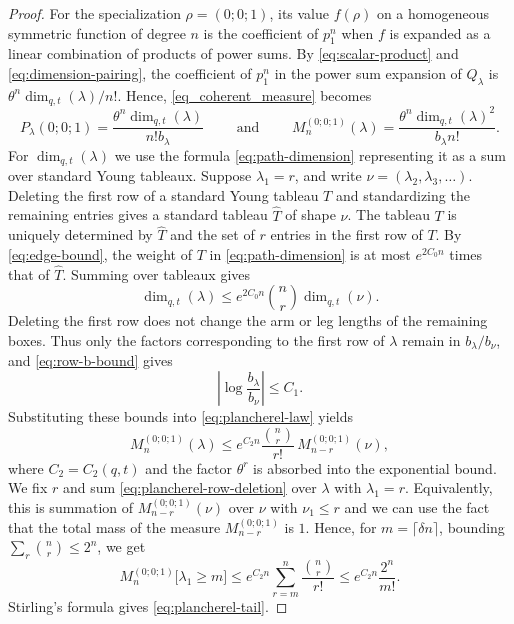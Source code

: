 \documentclass[11pt,reqno]{amsart}
\theoremstyle{definition}
\theoremstyle{remark}
\numberwithin{equation}{section}
\newcommand{\ddim}{\operatorname{dim}_{q,t}}
\begin{document}
\begin{proof}
For the specialization $\rho=(0;0;1)$, its value $f(\rho)$ on a homogeneous symmetric function of degree $n$ is the coefficient of $p_1^n$ when $f$ is expanded as a linear combination of products of power sums. By \eqref{eq:scalar-product} and \eqref{eq:dimension-pairing}, the
coefficient of $p_1^n$ in the power sum expansion of $Q_\lambda$ is
$\theta^n\ddim(\lambda)/n!$. Hence, \eqref{eq_coherent_measure} becomes
\begin{equation}\label{eq:plancherel-law}
P_\lambda(0;0;1)=\frac{\theta^n\ddim(\lambda)}{n!b_\lambda}\qquad
\text{ and } \qquad
 M_n^{(0;0;1)}(\lambda)=
 \frac{\theta^n\ddim(\lambda)^2}{b_\lambda n!}.
\end{equation}
For $\ddim(\lambda)$ we use the formula \eqref{eq:path-dimension} representing it as a sum over standard Young tableaux.
Suppose $\lambda_1=r$, and write $\nu=(\lambda_2,\lambda_3,\ldots)$.
Deleting the first row of a standard Young tableau $T$ and standardizing the
remaining entries gives a standard tableau $\widehat T$ of shape $\nu$.
The tableau $T$ is uniquely determined by $\widehat T$ and the set of $r$
entries in the first row of $T$. By \eqref{eq:edge-bound}, the weight of $T$ in \eqref{eq:path-dimension} is
at most $e^{2C_0n}$ times that of $\widehat T$. Summing over tableaux gives
\[
 \ddim(\lambda)\le e^{2C_0n}\binom nr\ddim(\nu).
\]
Deleting the first row does not change the arm or leg lengths of the
remaining boxes. Thus only the factors corresponding to the first row of $\lambda$ remain in $b_\lambda/b_\nu$,
and \eqref{eq:row-b-bound} gives
\[
 \left|\log\frac{b_\lambda}{b_\nu}\right|\le C_1.
\]
Substituting these bounds into \eqref{eq:plancherel-law} yields
\begin{equation}\label{eq:plancherel-row-deletion}
 M_n^{(0;0;1)}(\lambda)
 \le e^{C_2n}\frac{\binom nr}{r!}\,M_{n-r}^{(0;0;1)}(\nu),
\end{equation}
where $C_2=C_2(q,t)$ and the factor $\theta^r$ is absorbed into the
exponential bound. We fix $r$ and sum \eqref{eq:plancherel-row-deletion} over
$\lambda$ with $\lambda_1=r$. Equivalently, this is summation of $M_{n-r}^{(0;0;1)}(\nu)$ over $\nu$ with $\nu_1\le r$ and we can use the fact that the total mass of the measure $M_{n-r}^{(0;0;1)}$ is $1$. Hence, for $m=\lceil\delta n\rceil$, bounding $\sum_r {n\choose r}\le 2^n$, we get
\[
 M_n^{(0;0;1)}\bigl[\lambda_1\ge m\bigr]
 \le e^{C_2n}\sum_{r=m}^n\frac{\binom nr}{r!}
 \le e^{C_2n}\frac{2^n}{m!}.
\]
Stirling's formula gives \eqref{eq:plancherel-tail}.
\end{proof}
\end{document}
